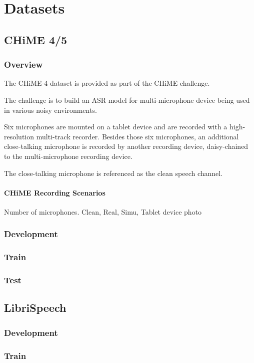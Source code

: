 \chapter{Datasets}\label{ch:dataset_ch}
\section{CHiME 4/5}
\subsection{Overview}
The CHiME-4 dataset is provided 
as part of the CHiME challenge.

The challenge is to build an ASR model
for multi-microphone device being used
in various noisy environments.

Six microphones are mounted on a tablet
device and are recorded with a high-resolution
multi-track recorder. Besides those six 
microphones, an additional 
close-talking microphone is recorded by
another recording device, daisy-chained to the
multi-microphone recording device.

The close-talking microphone is referenced as
the clean speech channel.

\subsubsection{CHiME Recording Scenarios}



Number of microphones.
Clean, Real, Simu,
Tablet device photo
\subsection{Development}
\subsection{Train}
\subsection{Test}

\section{LibriSpeech}
\subsection{Development}
\subsection{Train}

